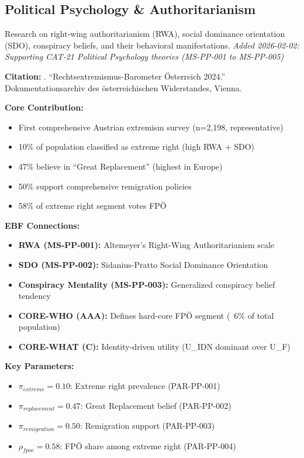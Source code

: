 \subsection{Political Psychology \& Authoritarianism}
\label{subsec:ot-political-psychology}

Research on right-wing authoritarianism (RWA), social dominance orientation (SDO), conspiracy beliefs, and their behavioral manifestations.
\textit{Added 2026-02-02: Supporting CAT-21 Political Psychology theories (MS-PP-001 to MS-PP-005)}

\begin{tcolorbox}[colback=yellow!5!white,colframe=yellow!75!black,title=Key Paper: DÖW Rechtsextremismus-Barometer (2024)]
\textbf{Citation:} \citet{PAP-doew2024rechtsextremismus}. ``Rechtsextremismus-Barometer Österreich 2024.'' Dokumentationsarchiv des österreichischen Widerstandes, Vienna.

\textbf{Core Contribution:}
\begin{itemize}[nosep]
    \item First comprehensive Austrian extremism survey (n=2,198, representative)
    \item 10\% of population classified as extreme right (high RWA + SDO)
    \item 47\% believe in ``Great Replacement'' (highest in Europe)
    \item 50\% support comprehensive remigration policies
    \item 58\% of extreme right segment votes FPÖ
\end{itemize}

\textbf{EBF Connections:}
\begin{itemize}[nosep]
    \item \textbf{RWA (MS-PP-001):} Altemeyer's Right-Wing Authoritarianism scale
    \item \textbf{SDO (MS-PP-002):} Sidanius-Pratto Social Dominance Orientation
    \item \textbf{Conspiracy Mentality (MS-PP-003):} Generalized conspiracy belief tendency
    \item \textbf{CORE-WHO (AAA):} Defines hard-core FPÖ segment (~6\% of total population)
    \item \textbf{CORE-WHAT (C):} Identity-driven utility (U\_IDN dominant over U\_F)
\end{itemize}

\textbf{Key Parameters:}
\begin{itemize}[nosep]
    \item $\pi_{extreme} = 0.10$: Extreme right prevalence (PAR-PP-001)
    \item $\pi_{replacement} = 0.47$: Great Replacement belief (PAR-PP-002)
    \item $\pi_{remigration} = 0.50$: Remigration support (PAR-PP-003)
    \item $\rho_{fpoe} = 0.58$: FPÖ share among extreme right (PAR-PP-004)
\end{itemize}


\end{tcolorbox}
